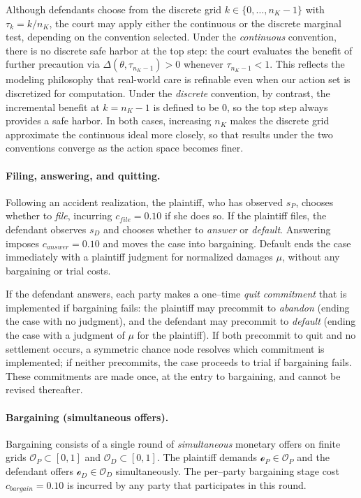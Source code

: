 \documentclass{article}
\begin{document}
Although defendants choose from the discrete grid $k\in\{0,\dots,n_K-1\}$ with $\tau_k=k/n_K$, the court may apply either the continuous or the discrete marginal test, depending on the convention selected. Under the \emph{continuous} convention, there is no discrete safe harbor at the top step: the court evaluates the benefit of further precaution via $\Delta(\theta,\tau_{n_K-1})>0$ whenever $\tau_{n_K-1}<1$. This reflects the modeling philosophy that real-world care is refinable even when our action set is discretized for computation. Under the \emph{discrete} convention, by contrast, the incremental benefit at $k=n_K-1$ is defined to be $0$, so the top step always provides a safe harbor. In both cases, increasing $n_K$ makes the discrete grid approximate the continuous ideal more closely, so that results under the two conventions converge as the action space becomes finer.

\paragraph{Filing, answering, and quitting.}
Following an accident realization, the plaintiff, who has observed $s_P$, chooses whether to \emph{file}, incurring $c_{file}=0.10$ if she does so. If the plaintiff files, the defendant observes $s_D$ and chooses whether to \emph{answer} or \emph{default}. Answering imposes $c_{answer}=0.10$ and moves the case into bargaining. Default ends the case immediately with a plaintiff judgment for normalized damages $\mu$, without any bargaining or trial costs.

If the defendant answers, each party makes a one–time \emph{quit commitment} that is implemented if bargaining fails: the plaintiff may precommit to \emph{abandon} (ending the case with no judgment), and the defendant may precommit to \emph{default} (ending the case with a judgment of $\mu$ for the plaintiff). If both precommit to quit and no settlement occurs, a symmetric chance node resolves which commitment is implemented; if neither precommits, the case proceeds to trial if bargaining fails. These commitments are made once, at the entry to bargaining, and cannot be revised thereafter.

\paragraph{Bargaining (simultaneous offers).}
Bargaining consists of a single round of \emph{simultaneous} monetary offers on finite grids $\mathcal{O}_P\subset[0,1]$ and $\mathcal{O}_D\subset[0,1]$. The plaintiff demands $\mathcal{o}_P\in\mathcal{O}_P$ and the defendant offers $\mathcal{o}_D\in\mathcal{O}_D$ simultaneously. The per–party bargaining stage cost $c_{bargain}=0.10$ is incurred by any party that participates in this round.
\end{document}
